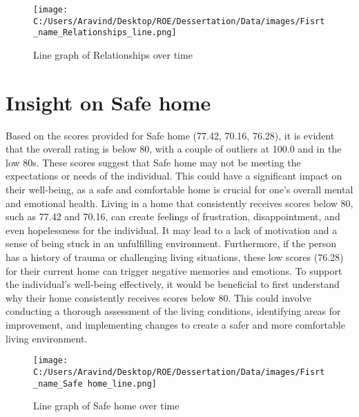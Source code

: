 \documentclass[10pt, a4paper]{article}%
\begin{document}
\begin{figure}[H]%
\centering%
\texttt{[image: C:/Users/Aravind/Desktop/ROE/Dessertation/Data/images/Fisrt\_name\_Relationships\_line.png]}%
\caption{Line graph of Relationships over time}%
\end{figure}

%
\section{Insight on Safe home}%
\label{sec:InsightonSafehome}%
Based on the scores provided for Safe home (77.42, 70.16, 76.28), it is evident that the overall rating is below 80, with a couple of outliers at 100.0 and in the low 80s. These scores suggest that Safe home may not be meeting the expectations or needs of the individual. This could have a significant impact on their well{-}being, as a safe and comfortable home is crucial for one’s overall mental and emotional health.\newline%
\newline%
Living in a home that consistently receives scores below 80, such as 77.42 and 70.16, can create feelings of frustration, disappointment, and even hopelessness for the individual. It may lead to a lack of motivation and a sense of being stuck in an unfulfilling environment. Furthermore, if the person has a history of trauma or challenging living situations, these low scores (76.28) for their current home can trigger negative memories and emotions.\newline%
\newline%
To support the individual's well{-}being effectively, it would be beneficial to first understand why their home consistently receives scores below 80. This could involve conducting a thorough assessment of the living conditions, identifying areas for improvement, and implementing changes to create a safer and more comfortable living environment.%


\begin{figure}[H]%
\centering%
\texttt{[image: C:/Users/Aravind/Desktop/ROE/Dessertation/Data/images/Fisrt\_name\_Safe home\_line.png]}%
\caption{Line graph of Safe home over time}%
\end{figure}

%
\end{document}
